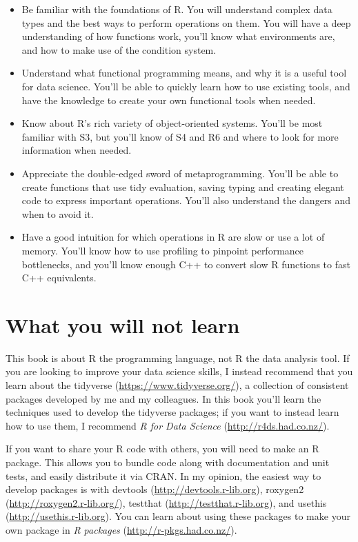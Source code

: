 \documentclass[
]{book}
\renewcommand{\href}[2]{#2 (\url{#1})}
\begin{document}
\begin{itemize}
\item
  Be familiar with the foundations of R. You will understand complex data types
  and the best ways to perform operations on them. You will have a deep
  understanding of how functions work, you'll know what environments are, and
  how to make use of the condition system.
\item
  Understand what functional programming means, and why it is a useful tool for
  data science. You'll be able to quickly learn how to use existing tools, and
  have the knowledge to create your own functional tools when needed.
\item
  Know about R's rich variety of object-oriented systems. You'll be most
  familiar with S3, but you'll know of S4 and R6 and where to look for more
  information when needed.
\item
  Appreciate the double-edged sword of metaprogramming. You'll be able to
  create functions that use tidy evaluation, saving typing and creating elegant
  code to express important operations. You'll also understand the dangers
  and when to avoid it.
\item
  Have a good intuition for which operations in R are slow or use a lot of
  memory. You'll know how to use profiling to pinpoint performance
  bottlenecks, and you'll know enough C++ to convert slow R functions to
  fast C++ equivalents.
\end{itemize}

\hypertarget{what-you-will-not-learn}{%
\section{What you will not learn}\label{what-you-will-not-learn}}

This book is about R the programming language, not R the data analysis tool. If you are looking to improve your data science skills, I instead recommend that you learn about the \href{https://www.tidyverse.org/}{tidyverse}, a collection of consistent packages developed by me and my colleagues. In this book you'll learn the techniques used to develop the tidyverse packages; if you want to instead learn how to use them, I recommend \href{http://r4ds.had.co.nz/}{\emph{R for Data Science}}.

If you want to share your R code with others, you will need to make an R package. This allows you to bundle code along with documentation and unit tests, and easily distribute it via CRAN. In my opinion, the easiest way to develop packages is with \href{http://devtools.r-lib.org}{devtools}, \href{http://roxygen2.r-lib.org/}{roxygen2}, \href{http://testthat.r-lib.org}{testthat}, and \href{http://usethis.r-lib.org}{usethis}. You can learn about using these packages to make your own package in \href{http://r-pkgs.had.co.nz/}{\emph{R packages}}.
\end{document}

